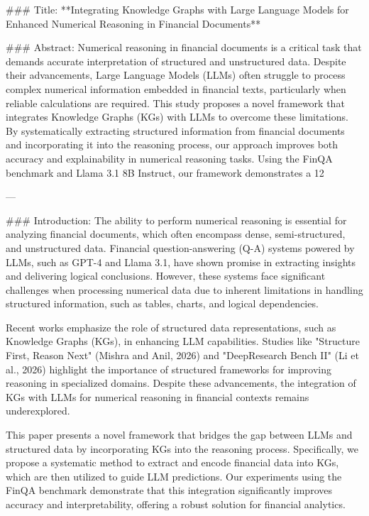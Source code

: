 ### Title:
**Integrating Knowledge Graphs with Large Language Models for Enhanced Numerical Reasoning in Financial Documents**

### Abstract:
Numerical reasoning in financial documents is a critical task that demands accurate interpretation of structured and unstructured data. Despite their advancements, Large Language Models (LLMs) often struggle to process complex numerical information embedded in financial texts, particularly when reliable calculations are required. This study proposes a novel framework that integrates Knowledge Graphs (KGs) with LLMs to overcome these limitations. By systematically extracting structured information from financial documents and incorporating it into the reasoning process, our approach improves both accuracy and explainability in numerical reasoning tasks. Using the FinQA benchmark and Llama 3.1 8B Instruct, our framework demonstrates a 12%

---

### Introduction:
The ability to perform numerical reasoning is essential for analyzing financial documents, which often encompass dense, semi-structured, and unstructured data. Financial question-answering (Q-A) systems powered by LLMs, such as GPT-4 and Llama 3.1, have shown promise in extracting insights and delivering logical conclusions. However, these systems face significant challenges when processing numerical data due to inherent limitations in handling structured information, such as tables, charts, and logical dependencies.

Recent works emphasize the role of structured data representations, such as Knowledge Graphs (KGs), in enhancing LLM capabilities. Studies like "Structure First, Reason Next" (Mishra and Anil, 2026) and "DeepResearch Bench II" (Li et al., 2026) highlight the importance of structured frameworks for improving reasoning in specialized domains. Despite these advancements, the integration of KGs with LLMs for numerical reasoning in financial contexts remains underexplored.

This paper presents a novel framework that bridges the gap between LLMs and structured data by incorporating KGs into the reasoning process. Specifically, we propose a systematic method to extract and encode financial data into KGs, which are then utilized to guide LLM predictions. Our experiments using the FinQA benchmark demonstrate that this integration significantly improves accuracy and interpretability, offering a robust solution for financial analytics.


